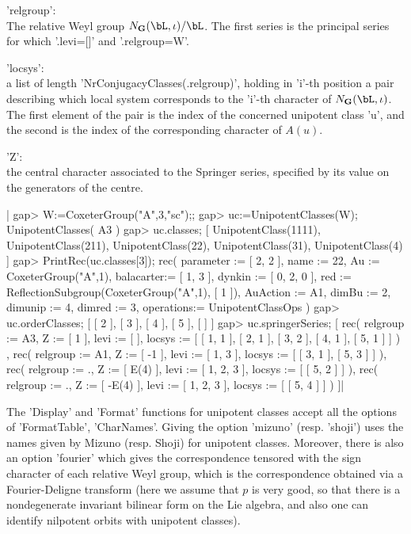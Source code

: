 'relgroup':\\  The  relative  Weyl  group $N_\bG(\bL,\iota)/\bL$. The first
series is the principal series for which '.levi=[]' and '.relgroup=W'.

'locsys':\\  a list  of length  'NrConjugacyClasses(.relgroup)', holding in
'i'-th  position a  pair describing  which local  system corresponds to the
'i'-th  character of $N_\bG(\bL,\iota)$.  The first element  of the pair is
the index of the concerned unipotent class 'u', and the second is the index
of the corresponding character of $A(u)$.

'Z':\\  the central character associated  to the Springer series, specified
by its value on the generators of the centre.

|    gap> W:=CoxeterGroup("A",3,"sc");;
    gap> uc:=UnipotentClasses(W);
    UnipotentClasses( A3 )
    gap> uc.classes;
    [ UnipotentClass(1111), UnipotentClass(211), UnipotentClass(22),
      UnipotentClass(31), UnipotentClass(4) ]
    gap> PrintRec(uc.classes[3]);
    rec(
      parameter := [ 2, 2 ],
      name      := 22,
      Au        := CoxeterGroup("A",1),
      balacarter:= [ 1, 3 ],
      dynkin    := [ 0, 2, 0 ],
      red       := ReflectionSubgroup(CoxeterGroup("A",1), [ 1 ]),
      AuAction  := A1,
      dimBu     := 2,
      dimunip   := 4,
      dimred    := 3,
      operations:= UnipotentClassOps )
    gap> uc.orderClasses;
    [ [ 2 ], [ 3 ], [ 4 ], [ 5 ], [  ] ]
    gap> uc.springerSeries;
    [ rec(
          relgroup := A3,
          Z := [ 1 ],
          levi := [  ],
          locsys := [ [ 1, 1 ], [ 2, 1 ], [ 3, 2 ], [ 4, 1 ], [ 5, 1 ] ] )
        , rec(
          relgroup := A1,
          Z := [ -1 ],
          levi := [ 1, 3 ],
          locsys := [ [ 3, 1 ], [ 5, 3 ] ] ), rec(
          relgroup := .,
          Z := [ E(4) ],
          levi := [ 1, 2, 3 ],
          locsys := [ [ 5, 2 ] ] ), rec(
          relgroup := .,
          Z := [ -E(4) ],
          levi := [ 1, 2, 3 ],
          locsys := [ [ 5, 4 ] ] ) ]|

The  'Display' and 'Format' functions for  unipotent classes accept all the
options  of 'FormatTable',  'CharNames'. Giving  the option 'mizuno' (resp.
'shoji')  uses  the  names  given  by  Mizuno  (resp.  Shoji) for unipotent
classes.  Moreover,  there  is  also  an  option  'fourier' which gives the
correspondence  tensored  with  the  sign  character  of each relative Weyl
group, which is the correspondence obtained via a Fourier-Deligne transform
(here  we assume that  $p$ is very  good, so that  there is a nondegenerate
invariant  bilinear  form  on  the  Lie  algebra, and also one can identify
nilpotent orbits with unipotent classes).

